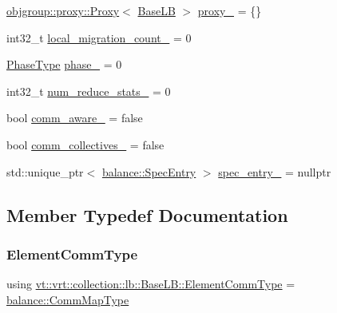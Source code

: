 \begin{DoxyCompactItemize}
\hyperlink{structvt_1_1objgroup_1_1proxy_1_1_proxy}{objgroup\+::proxy\+::\+Proxy}$<$ \hyperlink{structvt_1_1vrt_1_1collection_1_1lb_1_1_base_l_b}{Base\+LB} $>$ \hyperlink{structvt_1_1vrt_1_1collection_1_1lb_1_1_base_l_b_ab5cfe4d0cb73397c5ffe937f119bc71a}{proxy\+\_\+} = \{\}
\item 
int32\+\_\+t \hyperlink{structvt_1_1vrt_1_1collection_1_1lb_1_1_base_l_b_ae2beaf58c52b6ac2ccca8ab0c266f203}{local\+\_\+migration\+\_\+count\+\_\+} = 0
\item 
\hyperlink{namespacevt_a46ce6733d5cdbd735d561b7b4029f6d7}{Phase\+Type} \hyperlink{structvt_1_1vrt_1_1collection_1_1lb_1_1_base_l_b_a9bb7a04d3ef1012c95322d8375593498}{phase\+\_\+} = 0
\item 
int32\+\_\+t \hyperlink{structvt_1_1vrt_1_1collection_1_1lb_1_1_base_l_b_a15441a3f924a5dd38fb315d84aa6a7c8}{num\+\_\+reduce\+\_\+stats\+\_\+} = 0
\item 
bool \hyperlink{structvt_1_1vrt_1_1collection_1_1lb_1_1_base_l_b_a0b7eb81cc499a7cd7c1a6fd1f6a3c8fe}{comm\+\_\+aware\+\_\+} = false
\item 
bool \hyperlink{structvt_1_1vrt_1_1collection_1_1lb_1_1_base_l_b_a1db6d0f8b8f62be357c7913930556d44}{comm\+\_\+collectives\+\_\+} = false
\item 
std\+::unique\+\_\+ptr$<$ \hyperlink{structvt_1_1vrt_1_1collection_1_1balance_1_1_spec_entry}{balance\+::\+Spec\+Entry} $>$ \hyperlink{structvt_1_1vrt_1_1collection_1_1lb_1_1_base_l_b_a20ee2c313345b2fe60de1141f69774bd}{spec\+\_\+entry\+\_\+} = nullptr
\end{DoxyCompactItemize}


\subsection{Member Typedef Documentation}
\mbox{\label{structvt_1_1vrt_1_1collection_1_1lb_1_1_base_l_b_ac3f8560bfe41aa593eb7d5bd1241cc4c}} 
\subsubsection{\texorpdfstring{Element\+Comm\+Type}{ElementCommType}}
{\footnotesize\ttfamily using \hyperlink{structvt_1_1vrt_1_1collection_1_1lb_1_1_base_l_b_ac3f8560bfe41aa593eb7d5bd1241cc4c}{vt\+::vrt\+::collection\+::lb\+::\+Base\+L\+B\+::\+Element\+Comm\+Type} =  \hyperlink{namespacevt_1_1vrt_1_1collection_1_1balance_aa50d4cbbfa3c643e7303fc6e08f411fb}{balance\+::\+Comm\+Map\+Type}}

